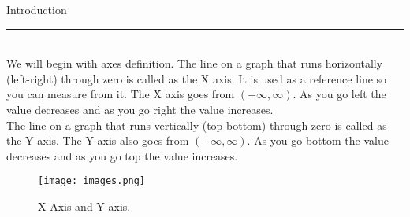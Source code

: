 \documentclass[twoside,openright]{report}
\begin{document}
{\Huge Introduction}\\
\rule{12cm}{0.05cm}\\
\newline
\newline
We will begin with axes definition. The line on a graph that runs horizontally (left-right) through zero is called as the X axis. It is used as a reference line so you can measure from it. The X axis goes from $(-\infty, \infty)$. As you go left the value decreases and as you go right the value increases.\\

The line on a graph that runs vertically (top-bottom) through zero is called as the Y axis. The Y axis also goes from $(-\infty, \infty)$. As you go bottom the value decreases and as you go top the value increases.

\begin{figure}[h!]
  \texttt{[image: images.png]}
  \caption{X Axis and Y axis.}
  \label{fig:axis1}
\end{figure}
\setcounter{page}{10}

\end{document}
